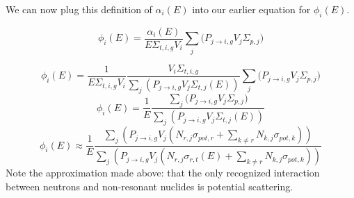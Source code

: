 \documentclass[10pt]{article}
\begin{document}
          We can now plug this definition of $\alpha_i(E)$ into our earlier equation for $\phi_i(E)$.

                \begin{equation*}\phi_{i}(E)=\frac{\alpha_i(E)}{E\Sigma_{t,i,g}V_i}\sum\limits_j\Big(P_{j\rightarrow i,g}V_{j}\Sigma_{p,j}\Big)\end{equation*}

        \begin{equation*}\phi_{i}(E)=\frac{1}{E\Sigma_{t,i,g}V_i}\frac{V_i\Sigma_{t,i,g}}{\sum\limits_{j}\left(P_{j\rightarrow i,g}V_{j}\Sigma_{t,j}(E)\right)}\sum\limits_j\Big(P_{j\rightarrow i,g}V_{j}\Sigma_{p,j}\Big)\end{equation*}
          \begin{equation*}\phi_{i}(E)=\frac{1}{E}\frac{\sum\limits_j\Big(P_{j\rightarrow i,g}V_{j}\Sigma_{p,j}\Big)}{\sum\limits_{j}\left(P_{j\rightarrow i,g}V_{j}\Sigma_{t,j}(E)\right)}\end{equation*}
            \begin{equation*}\phi_{i}(E)\approx\frac{1}{E}\frac{\sum\limits_j\left(P_{j\rightarrow i,g}V_{j}\left(N_{r,j}\sigma_{pot,r}+\sum\limits_{k\neq r}N_{k,j}\sigma_{pot,k}\right)\right)}{\sum\limits_{j}\left(P_{j\rightarrow i,g}V_{j}\left(N_{r,j}\sigma_{r,t}(E)+\sum\limits_{k\neq r}N_{k,j}\sigma_{pot,k}\right)\right)}\end{equation*}
            Note the approximation made above: that the only recognized interaction between neutrons and non-resonant nuclides is potential scattering.




\end{document}
